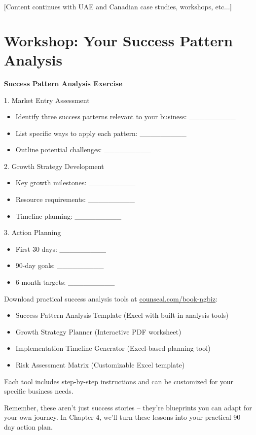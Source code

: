 [Content continues with UAE and Canadian case studies, workshops, etc...]

\section{Workshop: Your Success Pattern Analysis}\label{sec:success-workshop}

\begin{workshopbox}
\textbf{Success Pattern Analysis Exercise}

1. Market Entry Assessment
\begin{itemize}
    \item Identify three success patterns relevant to your business: \_\_\_\_\_\_\_\_\_
    \item List specific ways to apply each pattern: \_\_\_\_\_\_\_\_\_
    \item Outline potential challenges: \_\_\_\_\_\_\_\_\_
\end{itemize}

2. Growth Strategy Development
\begin{itemize}
    \item Key growth milestones: \_\_\_\_\_\_\_\_\_
    \item Resource requirements: \_\_\_\_\_\_\_\_\_
    \item Timeline planning: \_\_\_\_\_\_\_\_\_
\end{itemize}

3. Action Planning
\begin{itemize}
    \item First 30 days: \_\_\_\_\_\_\_\_\_
    \item 90-day goals: \_\_\_\_\_\_\_\_\_
    \item 6-month targets: \_\_\_\_\_\_\_\_\_
\end{itemize}
\end{workshopbox}

\begin{communitybox}
Download practical success analysis tools at \href{https://viz.li/csl-book-ngbiz}{counseal.com/book-ngbiz}:
\begin{itemize}
    \item Success Pattern Analysis Template (Excel with built-in analysis tools)
    \item Growth Strategy Planner (Interactive PDF worksheet)
    \item Implementation Timeline Generator (Excel-based planning tool)
    \item Risk Assessment Matrix (Customizable Excel template)
\end{itemize}
Each tool includes step-by-step instructions and can be customized for your specific business needs.
\end{communitybox}

\begin{importantbox}
Remember, these aren't just success stories – they're blueprints you can adapt for your own journey. In Chapter 4, we'll turn these lessons into your practical 90-day action plan.
\end{importantbox}